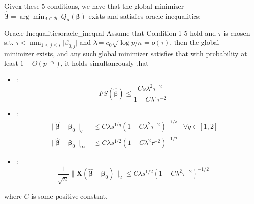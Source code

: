 \documentclass[twoside]{article}
\begin{document}
Given these 5 conditions, we have that the global minimizer $\hat{\boldsymbol{\beta}} = \arg \min_{\boldsymbol{\beta}\in \mathcal{B}_{\tau}}Q_n(\boldsymbol{\beta})$ exists and satisfies oracle inequalities:
\begin{theorem}{Oracle Inequalities}{oracle_inequal}
    Assume that Condition 1-5 hold and $\tau$ is chosen s.t. $\tau < \min_{1\leq j \leq s}\lvert \beta_{0,j} \rvert$ and $\lambda = c_0\sqrt{\log p/n} = o(\tau)$, then the global minimizer exists, and any such global minimizer satisfies that with probability at least $1-O(p^{-c_1})$, it holds simultaneously that 
    \begin{itemize}
        \item {}: $$FS(\hat{\boldsymbol{\beta}}) \leq \frac{Cs \lambda^2 \tau^{-2}}{1-C\lambda^2\tau^{-2}}$$
        \item {}: 
        \begin{align*}
            \lVert \hat{\boldsymbol{\beta}} - \boldsymbol{\beta}_0\rVert _q &\leq C\lambda s^{1/q} (1-C\lambda^2\tau^{-2})^{-1/q} &\forall q\in [1,2]\\
            \lVert \hat{\boldsymbol{\beta}} - \boldsymbol{\beta}_0\rVert _{\infty} &\leq C\lambda s^{1/2} (1-C\lambda^2\tau^{-2})^{-1/2}
        \end{align*}
        \item {}: $$\frac{1}{\sqrt{n}} \lVert \mathbf{X}\left(\hat{\boldsymbol{\beta}} - \boldsymbol{\beta}_0\right)\rVert _2 \leq C\lambda s^{1/2} (1-C\lambda^2\tau^{-2})^{-1/2}  $$
    \end{itemize}
    where $C$ is some positive constant.
\end{theorem}
\end{document}
